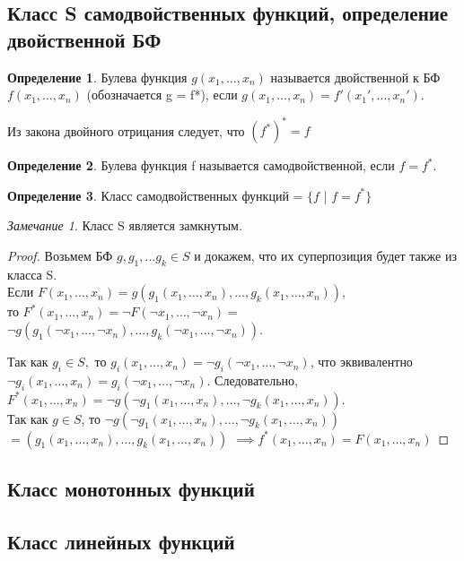 \documentclass[a4paper]{article}
\theoremstyle{definition}
\newtheorem*{definition}{Определение}
\theoremstyle{remark}
\newtheorem*{remark}{Замечание}
\begin{document}
    \subsection{Класс S самодвойственных функций, определение двойственной БФ}
    \begin{definition}
        Булева функция $g(x_1, \dots, x_n)$ называется двойственной к БФ $f(x_1, \dots, x_n)$
        (обозначается g = f*), если $g(x_1, \dots, x_n) = f'(x_1', \dots, x_n')$.
    \end{definition}
    Из закона двойного отрицания следует, что $(f^*)^* = f$
    \begin{definition}
        Булева функция f называется самодвойственной, если $f = f^*$.
    \end{definition}
    \begin{definition}
        Класс самодвойственных функций = $\{f$ | $f = f^*\}$
    \end{definition}
    \begin{remark}
        Класс S является замкнутым.
    \end{remark}
    \begin{proof}
        Возьмем БФ $g, g_1, \dots g_k \in S$ и докажем, что их
        суперпозиция будет также из класса S. \\
        Если $F(x_1, \dots, x_n) = g(g_1(x_1, \dots, x_n), \dots, g_k(x_1, \dots, x_n))$,\\
        то $F^*(x_1, \dots, x_n) = \neg F(\neg x_1, \dots, \neg x_n) = $
        $\neg g(g_1(\neg x_1, \dots, \neg x_n), \dots, g_k(\neg x_1, \dots, \neg x_n))$.

        Так как $g_i \in S,$ то $g_i(x_1, \dots, x_n) = \neg g_i(\neg x_1, \dots, \neg x_n)$,
        что эквивалентно $ \neg g_i(x_1, \dots, x_n) = g_i(\neg x_1, \dots, \neg x_n)$.
        Следовательно, $F^*(x_1, \dots, x_n) = \neg g(\neg g_1(x_1, \dots, x_n), \dots, \neg g_k (x_1, \dots, x_n))$.\\
        Так как $g\in S$, то $\neg g(\neg g_1(x_1, \dots, x_n), \dots, \neg g_k (x_1, \dots, x_n))$
        $= (g_1(x_1, \dots, x_n), \dots, g_k(x_1, \dots, x_n))$
        $\implies f^*(x_1, \dots, x_n) = F(x_1, \dots, x_n)$
    \end{proof}
    \subsection{Класс монотонных функций}
    \subsection{Класс линейных функций}
\end{document}
